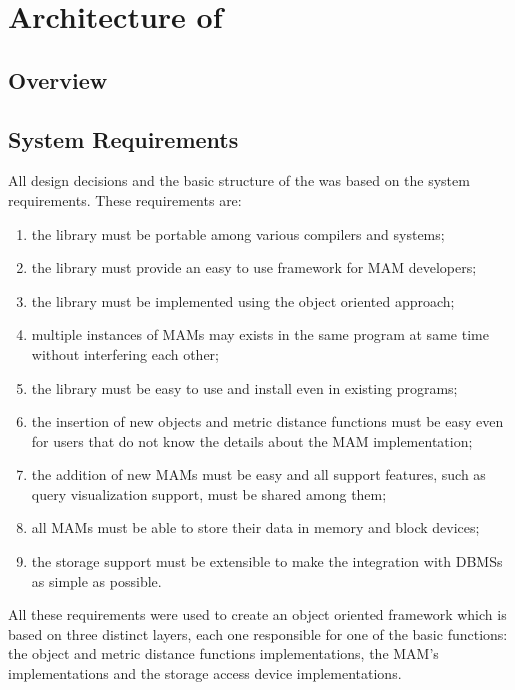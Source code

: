 \chapter{Architecture of \libname}
\label{cha:arch}

\section{Overview}
\label{sec:arch.overview}


\section{System Requirements}
\label{sec:arch.requirements}

All design decisions and the basic structure of the \libname{ }was based on the system requirements. These requirements are:

\begin{enumerate}
	\item the library must be portable among various compilers and systems;
	\item the library must provide an easy to use framework for MAM developers;
	\item the library must be implemented using the object oriented approach;
	\item multiple instances of MAMs may exists in the same program at same time without interfering each other;
	\item the library must be easy to use and install even in existing programs;
	\item the insertion of new objects and metric distance functions must be easy even for users that do not know the details about the MAM implementation;
	\item the addition of new MAMs must be easy and all support features, such as query visualization support, must be shared among them;
	\item all MAMs must be able to store their data in memory and block devices;
	\item the storage support must be extensible to make the integration with DBMSs as simple as possible.
\end{enumerate}

All these requirements were used to create an object oriented framework which is based on three distinct layers, each one responsible for one of the basic functions: the object and metric distance functions implementations, the MAM's implementations and the storage access device implementations.

